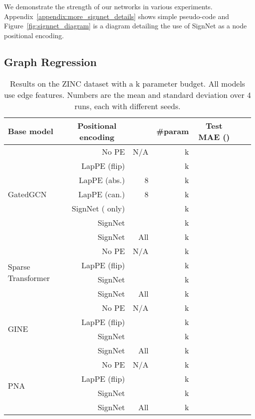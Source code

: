\documentclass{article} \usepackage{iclr2023_conference,times}
\begin{document}
We demonstrate the strength of our networks in various experiments. Appendix~\ref{appendix:more_signnet_details} shows simple pseudo-code and Figure~\ref{fig:signnet_diagram} is a diagram detailing the use of SignNet as a node positional encoding.

\subsection{Graph Regression}\label{sec:graph_regression}

\begin{table}[ht]
    \centering
    \caption{Results on the ZINC dataset with a k parameter budget. All models use edge features. Numbers are the mean and standard deviation over 4 runs, each with different seeds.}
    \label{tab:zinc}
    {\small
    \begin{tabular}{lrrrrrr}
        \toprule
        Base model
        & \multicolumn{1}{c}{Positional encoding}  & \multicolumn{1}{c}{} & \multicolumn{1}{c}{\#param} 
        & \multicolumn{1}{c}{Test MAE ()}\\
        \midrule
   \multirow{7}{*}{GatedGCN} & No PE  & N/A & k &  \\
         & LapPE (flip)  &  & k &  \\
         & LapPE (abs.)  & 8 & k &  \\
         & LapPE (can.)  & 8 & k &  \\
         & SignNet ( only) &  & k &
  \\
         & SignNet &  & k &
  \\
    & SignNet & All & k &
      \\
        \midrule
        \multirow{4}{*}{Sparse  Transformer} & No PE  & N/A & k &  \\
         & LapPE (flip)  &  & k &  \\
         & SignNet  &  & k &  \\
         & SignNet  & All & k &  \\
        \midrule
        \multirow{4}{*}{GINE} & No PE  & N/A & k &  \\
         & LapPE (flip)  &  & k &  \\
         & SignNet  &  & k &  \\
         & SignNet & All & k &  \\
         \midrule
         \multirow{4}{*}{PNA} & No PE  & N/A & k  &  \\
         & LapPE (flip)  &  & k &  \\
         & SignNet  &  & k  &  \\
         & SignNet  & All & k  &  \\
        
        \bottomrule
    \end{tabular}
}
    \vspace{-5pt}
\end{table}
\end{document}
